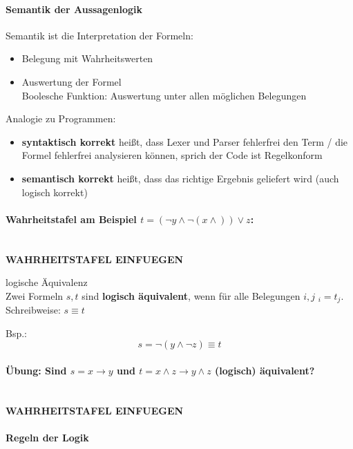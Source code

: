 \paragraph{Semantik der Aussagenlogik}
%
Semantik ist die Interpretation der Formeln:
\begin{itemize}
\item Belegung mit Wahrheitswerten
\item Auswertung der Formel\\
Boolesche Funktion: Auswertung unter allen möglichen Belegungen
\end{itemize}
Analogie zu Programmen:
\begin{itemize}
\item \textbf{syntaktisch korrekt} heißt, dass Lexer und Parser fehlerfrei den Term / die Formel fehlerfrei analysieren können, sprich der Code ist Regelkonform
\item \textbf{semantisch korrekt} heißt, dass das richtige Ergebnis geliefert wird (auch logisch korrekt)
\end{itemize}
%
\paragraph{Wahrheitstafel am Beispiel $t = (\neg y \land \neg(x \land) ) \lor z$:}
\ \\ \textbf{WAHRHEITSTAFEL EINFUEGEN}
%
\begin{defi}{logische Äquivalenz}
\\Zwei Formeln $s,t$ sind \textbf{logisch äquivalent}, wenn für alle Belegungen $i,j$ $_i = t_j$.\\
Schreibweise: $s \equiv t$

Bsp.:
\[ s = \neg( y \land \neg z ) \equiv t \]
\end{defi}
%
\paragraph{Übung: Sind $s = x \rightarrow y$ und $t = x \land z \rightarrow y \land z$ (logisch) äquivalent?}
\ \\ \textbf{WAHRHEITSTAFEL EINFUEGEN}
%
\paragraph{Regeln der Logik}
